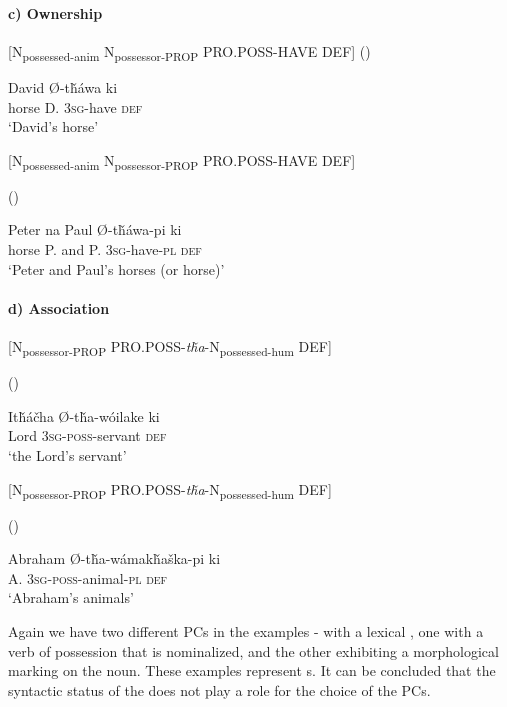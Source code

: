 \documentclass[output=paper]{LSP/langsci}
\begin{document}
\paragraph*{c)	Ownership}

[N\textsubscript{possessed-anim} N\textsubscript{possessor-PROP} PRO.POSS-HAVE DEF] 
\ea	{} (\citealt[91]{Buechel1939}) \label{lakotadavidshorse}

   David   Ø-t\v{h}áwa    ki \\
horse      D.   \textsc{3sg}-have  \textsc{def} \\
\glt `David's horse'
\z

[N\textsubscript{possessed-anim} N\textsubscript{possessor-PROP} PRO.POSS-HAVE DEF]

\ea {} (\citealt[91]{Buechel1939})

 Peter  na  Paul   Ø-t\v{h}áwa-pi     ki  \\
horse    P.       and P.      \textsc{3sg}-have-\textsc{pl} \textsc{def} \\
\glt `Peter and Paul's horses (or horse)'
\z


\newpage
\paragraph*{d)	Association}

[N\textsubscript{possessor-PROP} PRO.POSS-\textit{t\v{h}a}-N\textsubscript{possessed-hum} DEF]

\ea	{} (\citealt[92]{Buechel1939})

\gll It\v{h}\'a\v{c}ha    Ø-t\v{h}a-wóilake   ki  \\
Lord   \textsc{3sg-poss}-servant   \textsc{def} \\
\glt `the Lord's servant'
\z

[N\textsubscript{possessor-PROP} PRO.POSS-\textit{t\v{h}a}-N\textsubscript{possessed-hum} DEF]

\ea	{} (\citealt[92]{Buechel1939}) \label{lakotaabraham}

\gll Abraham Ø-t\v{h}a-w\'amak\v{h}a\v{s}ka-pi ki  \\
 A. \textsc{3sg-poss}-animal-\textsc{pl}  \textsc{def} \\
\glt `Abraham's animals'
\z

Again we have two different PCs in the examples - with a lexical , one with a verb of possession that is nominalized, and the other exhibiting a morphological  marking on the  noun. These examples represent s. It can be concluded that the syntactic status of the  does not play a role for the choice of the PCs.
\end{document}
